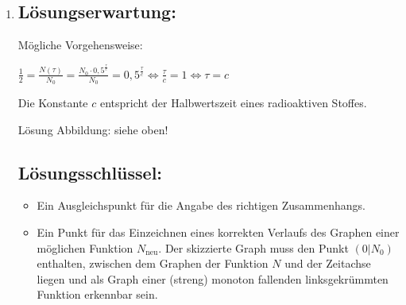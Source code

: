 \begin{langesbeispiel}
{\begin{enumerate}
\begin{itemize}
	Die Aufgabe ist auch dann als richtig gelöst zu werten, wenn bei korrektem Ansatz das Ergebnis aufgrund eines Rechenfehlers nicht richtig ist.
	\item Ein Punkt für eine (sinngemäß) korrekte Begründung dafür, dass weniger als die Hälfte der ursprünglich vorhandenen $^14$C-Atomkerne zerfallen sind. Andere korrekte Begründungen (z.B. über das Absinken der Aktivität) sind ebenfalls als richtig zu werten.
\end{itemize}

\item \subsection{Lösungserwartung:}

Mögliche Vorgehensweise:

$\frac{1}{2}=\frac{N(\tau)}{N_0}=\frac{N_0\cdot 0,5^{\frac{\tau}{c}}}{N_0}=0,5^{\frac{\tau}{c}}\Leftrightarrow\frac{\tau}{c}=1\Leftrightarrow\tau=c$

Die Konstante $c$ entspricht der Halbwertszeit eines radioaktiven Stoffes.

Lösung Abbildung: siehe oben!

\subsection{Lösungsschlüssel:}
\begin{itemize}
	\item Ein Ausgleichspunkt für die Angabe des richtigen Zusammenhangs.
	\item Ein Punkt für das Einzeichnen eines korrekten Verlaufs des Graphen einer möglichen Funktion $N_{\text{neu}}$. Der skizzierte Graph muss den Punkt $(0|N_0)$ enthalten, zwischen dem Graphen der Funktion $N$ und der Zeitachse liegen und als Graph einer (streng) monoton fallenden linksgekrümmten Funktion erkennbar sein.
\end{itemize}
\end{enumerate}}
		\end{langesbeispiel}